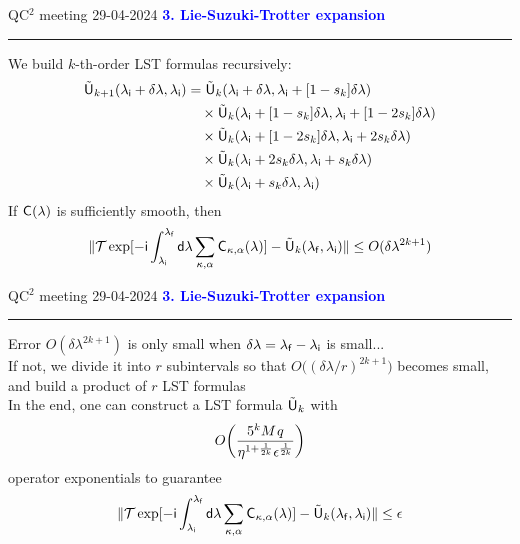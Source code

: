 \documentclass{beamer}
\def\lbt{\small QC$^2$ meeting 29-04-2024} %
\def\mt#1{\kern0.025em\mathsf{#1}\kern0.025em}
\def\d{\mathsf d}
\def\i{\mathsf i}
\def\lambdai{{\lambda_{\sf i}}}
\def\lambdaf{{\lambda_{\sf f}}}
\def\>{\kern0.08em}
\newenvironment{dia}[2]
{
	\begin{frame}
	\vspace{1mm}
	{\small #1}
	\hfill
    {\small\bf\textcolor{blue}{#2}}
	\vspace{3mm}
	\hrule
	\bigskip
}
{
	\vfill
	\end{frame}
}
\begin{document}
\begin{dia}{\lbt}{3. Lie-Suzuki-Trotter expansion}
We build $k$-th-order LST formulas recursively:
\begin{align*}
\tilde{\mt U}_{k + 1}(\lambdai + \delta\lambda, \lambdai) &= \tilde{\mt U}_k(\lambdai + \delta\lambda, \lambdai + [1 - s_k] \delta\lambda) \\
&\quad \times \tilde{\mt U}_k(\lambdai + [1 - s_k] \delta\lambda, \lambdai + [1 - 2 s_k] \delta\lambda) \nonumber\\
&\quad \times \tilde{\mt U}_k(\lambdai + [1 - 2 s_k] \delta\lambda, \lambdai + 2 s_k \delta\lambda) \\
&\quad \times \tilde{\mt U}_k(\lambdai + 2 s_k \delta\lambda, \lambdai + s_k \delta\lambda) \\
&\quad \times \tilde{\mt U}_k(\lambdai + s_k \delta\lambda, \lambdai)
\end{align*} \pause
If $\mt C(\lambda)$ is sufficiently smooth, then
\begin{align*}
    \| \mathcal T \exp[-\i \int_\lambdai^\lambdaf \d\lambda \sum_{\kappa, \alpha} \mt C_{\kappa, \alpha}(\lambda)] - \tilde{\mt U}_k(\lambdaf, \lambdai) \| \leq O(\delta\lambda^{2k+1})
\end{align*}
\vspace{-1cm}
\end{dia}

\begin{dia}{\lbt}{3. Lie-Suzuki-Trotter expansion}
Error $O(\delta\lambda^{2k + 1})$ is only small when $\delta\lambda = \lambdaf - \lambdai$ is small... \\[4mm] \pause
If not, we divide it into $r$ subintervals so that $O\big( (\delta\lambda / r)^{2k + 1} \big)$ becomes small, and build a product of $r$ LST formulas \\[4mm] \pause
In the end, one can construct a LST formula $\tilde{\mt U}_k$ with
\begin{align*}
    O\bigg( \frac{5^k M \> q}{\eta^{1 + \frac1{2k}}\epsilon^{\frac1{2k}}} \bigg)
\end{align*}
operator exponentials to guarantee 
\begin{align*}
    \| \mathcal T \exp[-\i \int_\lambdai^\lambdaf \d\lambda \sum_{\kappa, \alpha} \mt C_{\kappa, \alpha}(\lambda)] - \tilde{\mt U}_k(\lambdaf, \lambdai) \| \leq \epsilon
\end{align*}
\vspace{-1cm}
\end{dia}
\end{document}
